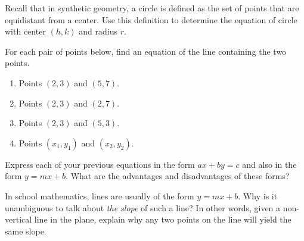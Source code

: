 \documentclass[nooutcomes]{ximera}
\begin{document}
\newpage

\begin{problem}
Recall that in synthetic geometry, a circle is defined as the set of points that are equidistant from a center.  Use this definition to determine the equation of circle with center $(h, k)$ and radius $r$.
\vfill
\end{problem}

\begin{problem}
For each pair of points below, find an equation of the line containing the two points.  
\begin{enumerate}
\item Points $(2,3)$ and $(5,7)$.  
\item Points $(2,3)$ and $(2,7)$.  
\item Points $(2,3)$ and $(5,3)$. 
\item Points $(x_1, y_1)$ and $(x_2, y_2)$.  
\end{enumerate}
\vfill
\end{problem}

\newpage
\begin{problem}
Express each of your previous equations in the form $ax + by = c$ and also in the form $y = mx + b$.   What are the advantages and disadvantages of these forms?  
\vfill
\end{problem}

\begin{problem}
In school mathematics, lines are usually of the form $y = mx + b$.  Why is it unambiguous to talk about \emph{the slope} of such a line?  In other words, given a non-vertical line in the plane, explain why any two points on the line will yield the same slope.
\vfill
\end{problem}
\end{document}
